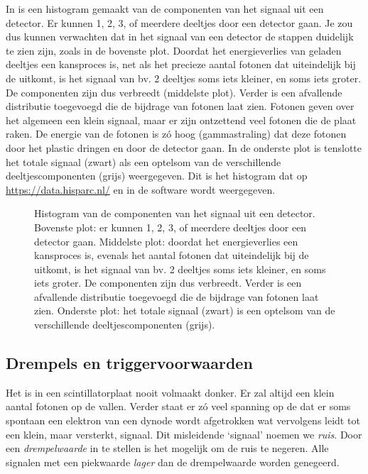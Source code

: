 In  is een histogram gemaakt van de
componenten van het signaal uit een \hisparc detector.  Er kunnen 1, 2, 3,
of meerdere deeltjes door een detector gaan.  Je zou dus kunnen verwachten
dat in het signaal van een \hisparc detector de stappen duidelijk te zien
zijn, zoals in de bovenste plot.  Doordat het energieverlies van geladen
deeltjes een kansproces is, net als het precieze aantal fotonen dat
uiteindelijk bij de \pmt uitkomt, is het signaal van bv. 2 deeltjes soms
iets kleiner, en soms iets groter.  De componenten zijn dus verbreedt
(middelste plot).  Verder is een afvallende distributie toegevoegd die de
bijdrage van fotonen laat zien.  Fotonen geven over het algemeen een klein
signaal, maar er zijn ontzettend veel fotonen die de plaat raken.  De
energie van de fotonen is zó hoog (gammastraling) dat deze fotonen door
het plastic dringen en door de detector gaan.  In de onderste plot is
tenslotte het totale signaal (zwart) als een optelsom van de verschillende
deeltjescomponenten (grijs) weergegeven.  Dit is het histogram dat op
\url{https://data.hisparc.nl/} en in de \daq software wordt weergegeven.

\begin{figure}
\centering

\caption{Histogram van de componenten van het signaal uit een \hisparc
detector.  Bovenste plot: er kunnen 1, 2, 3, of meerdere deeltjes door een
detector gaan.  Middelste plot: doordat het energieverlies een kansproces
is, evenals het aantal fotonen dat uiteindelijk bij de \pmt uitkomt, is
het signaal van bv. 2 deeltjes soms iets kleiner, en soms iets groter.  De
componenten zijn dus verbreedt.  Verder is een afvallende distributie
toegevoegd die de bijdrage van fotonen laat zien.  Onderste plot: het
totale signaal (zwart) is een optelsom van de verschillende
deeltjescomponenten (grijs).}
\label{fig:spectrum_componenten}
\end{figure}


\subsection{Drempels en triggervoorwaarden}

Het is in een scintillatorplaat nooit volmaakt donker.  Er zal altijd een
klein aantal fotonen op de \pmt vallen.  Verder staat er zó veel spanning
op de \pmt dat er soms spontaan een elektron van een dynode wordt
afgetrokken wat vervolgens leidt tot een klein, maar versterkt, signaal.
Dit misleidende `signaal' noemen we \emph{ruis}.  Door een
\emph{drempelwaarde} in te stellen is het mogelijk om de ruis te negeren.
Alle signalen met een piekwaarde \emph{lager} dan de drempelwaarde worden
genegeerd.

